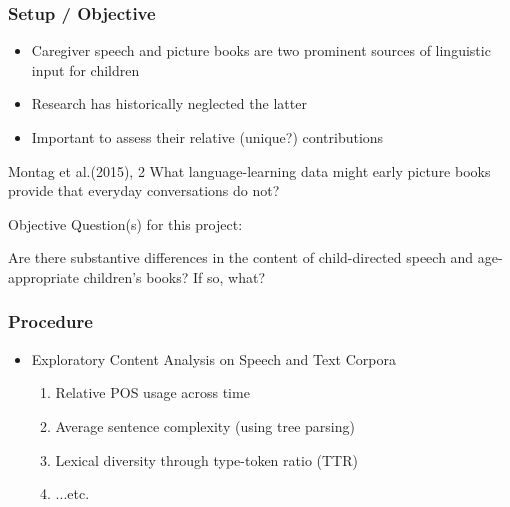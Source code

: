 \documentclass{beamer}
\begin{document}
\begin{frame}
	\frametitle{Setup / Objective}
	\begin{itemize}
		
		\item Caregiver speech and picture books are two prominent sources of linguistic input for children
		\item Research has historically neglected the latter
		\item Important to assess their relative (unique?) contributions
		
	\end{itemize}
	\begin{block}{Montag et al.(2015), 2}
		What language-learning data might early picture books provide that everyday conversations do not?
	\end{block}
\end{frame}


\begin{frame}{Objective}
	\small Question(s) for this project: \\
	\begin{center}
		\Large Are there substantive differences in the content of child-directed speech and age-appropriate children's books? If so, what?
	\end{center}
\end{frame}

\begin{frame}
	\frametitle{Procedure}
	\begin{itemize}
		\item Exploratory Content Analysis on Speech and Text Corpora
		\begin{enumerate}
			\item Relative POS usage across time
			\item Average sentence complexity (using tree parsing)
			\item Lexical diversity through type-token ratio (TTR)
			\item ...etc.
			
		\end{enumerate}
	\end{itemize}
\end{frame}
\end{document}
